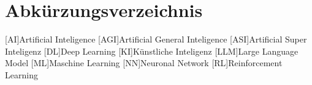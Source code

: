 \thispagestyle{empty}

\def\arp{\ac{ARP}\xspace}

\chapter*{Abkürzungsverzeichnis}\label{cha:Abkürzungsverzeichnis}

\begin{acronym}[SPACEBETWEEN]\itemsep3pt
%
       

    [AI]{Artificial Inteligence}
    [AGI]{Artificial General Inteligence}
    [ASI]{Artificial Super Inteligenz}
    [DL]{Deep Learning}
    [KI]{Künstliche Inteligenz}
    [LLM]{Large Language Model}
    [ML]{Maschine Learning}
    [NN]{Neuronal Network}
    [RL]{Reinforcement Learning}


    
\end{acronym}
\newpage
